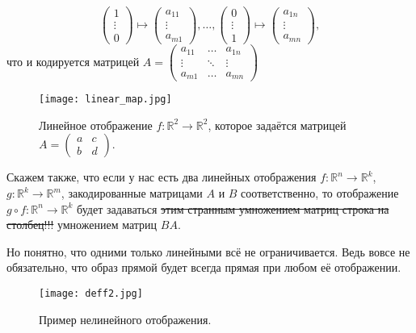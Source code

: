 \[
 \begin{pmatrix}
     1 \\ \vdots \\ 0
 \end{pmatrix} \mapsto \begin{pmatrix}
     a_{11} \\ \vdots \\ a_{m1}
 \end{pmatrix}, \ldots, \begin{pmatrix}
     0 \\ \vdots \\ 1
 \end{pmatrix} \mapsto \begin{pmatrix}
     a_{1n} \\ \vdots \\ a_{mn}
 \end{pmatrix},
\]
что и кодируется матрицей 
$A = \begin{pmatrix}
    a_{11} & \ldots & a_{1n} \\
    \vdots & \ddots & \vdots \\
    a_{m1} & \ldots & a_{mn}
\end{pmatrix}$

\begin{figure}[h!]
    \centering
    \texttt{[image: linear\_map.jpg]}
    \caption{Линейное отображение $f:\mathbb{R}^2 \to \mathbb{R}^2$, которое задаётся матрицей $A = \begin{pmatrix}
        a & c \\
        b & d
    \end{pmatrix}.$}
    \label{linear_map}
\end{figure}

Скажем также, что если у нас есть два линейных отображения $f:\mathbb{R}^n \to \mathbb{R}^k$, $g:\mathbb{R}^k \to \mathbb{R}^m$, закодированные матрицами $A$ и $B$ соответственно, то отображение $g \circ f: \mathbb{R}^n \to \mathbb{R}^k$ будет задаваться \sout{этим странным умножением матриц строка на столбец!!!} умножением матриц $BA$.

Но понятно, что одними только линейными всё не ограничивается. Ведь вовсе не обязательно, что образ прямой будет всегда прямая при любом её отображении.


\begin{figure}
    \centering
    \texttt{[image: deff2.jpg]}
    \caption{Пример нелинейного отображения.}
    \label{deff2}
\end{figure}

